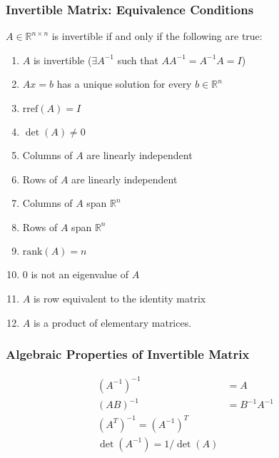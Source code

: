 \documentclass[10pt]{article}
\begin{document}
\subsubsection*{Invertible Matrix: Equivalence Conditions}
$A \in \mathbb{R}^{n \times n}$ is invertible if and only if the following are true:
\begin{enumerate}
    \item $A$ is invertible ($\exists A^{-1}$ such that $AA^{-1} = A^{-1}A = I$)
    \item $Ax = b$ has a unique solution for every $b \in \mathbb{R}^n$
    \item $\text{rref}(A) = I$
    \item $\det(A) \neq 0$
    \item Columns of $A$ are linearly independent
    \item Rows of $A$ are linearly independent
    \item Columns of $A$ span $\mathbb{R}^n$
    \item Rows of $A$ span $\mathbb{R}^n$
    \item $\text{rank}(A) = n$
    \item $0$ is not an eigenvalue of $A$
    \item $A$ is row equivalent to the identity matrix
    \item $A$ is a product of elementary matrices.
\end{enumerate}

\subsubsection*{Algebraic Properties of Invertible Matrix}
\begin{align*}
    (A^{-1})^{-1} &= A \\ 
    (AB)^{-1} &= B^{-1} A^{-1} \\
    (A^T)^{-1} = (A^{-1})^T \\
    \det(A^{-1}) = 1 / \det(A)
\end{align*}
\end{document}
